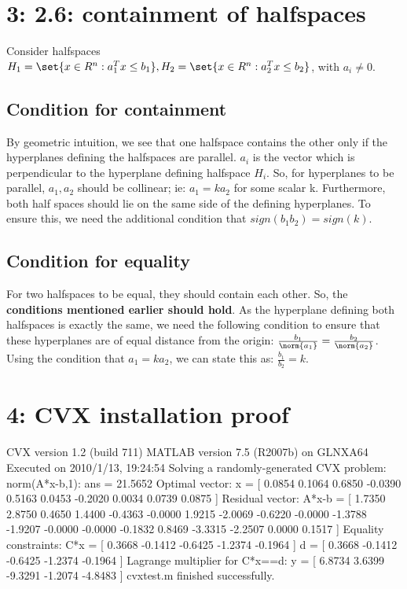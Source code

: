 \documentclass{article}
\begin{document}
\section{3: 2.6: containment of halfspaces}
Consider halfspaces $H_1 = \set{x \in R^{n}: a_1^{T}x \leq b_1}, H_2 = \set{x \in R^{n}: a_2^{T}x \leq b_2}$, with $a_i \neq 0$.

\subsection{Condition for containment}
By geometric intuition, we see that one halfspace contains the other only if the hyperplanes defining the halfspaces are parallel. $a_i$ is the vector which is perpendicular to the hyperplane defining halfspace $H_i$. So, for hyperplanes to be parallel, $a_1, a_2$ should be collinear; ie: $a_1 = k a_2$ for some scalar k. Furthermore, both half spaces should lie on the same side of the defining hyperplanes. To ensure this, we need the additional condition that $sign(b_1 b_2) = sign(k)$.

\subsection{Condition for equality}
For two halfspaces to be equal, they should contain each other. So, the \textbf{conditions mentioned earlier should hold}. As the hyperplane defining both halfspaces is exactly the same, we need the following condition to ensure that these hyperplanes are of equal distance from the origin: $\frac{b_1}{\norm{a_1}} = \frac{b_2}{\norm{a_2}}$. Using the condition that $a_1 = k a_2$, we can state this as: $\frac{b_1}{b_2} = k$.

\section{4: CVX installation proof}
\begin{verbatim*}
CVX version 1.2 (build 711)
MATLAB version 7.5 (R2007b) on GLNXA64
Executed on 2010/1/13, 19:24:54
Solving a randomly-generated CVX problem:
norm(A*x-b,1):
   ans   =   21.5652
Optimal vector:
   x     = [  0.0854  0.1064  0.6850 -0.0390  
   0.5163  0.0453 -0.2020  0.0034  0.0739  0.0875 ]
Residual vector:
   A*x-b = [  1.7350  2.8750  0.4650  1.4400 
   -0.4363 -0.0000  1.9215 -2.0069 -0.6220 -0.0000 -1.3788 
   -1.9207 -0.0000 -0.0000 -0.1832  0.8469 -3.3315 -2.2507  
   0.0000  0.1517 ]
Equality constraints:
   C*x   = [  0.3668 -0.1412 -0.6425 -1.2374 -0.1964 ]
   d     = [  0.3668 -0.1412 -0.6425 -1.2374 -0.1964 ]
Lagrange multiplier for C*x==d:
   y     = [  6.8734  3.6399 -9.3291 -1.2074 -4.8483 ]
cvxtest.m finished successfully.
\end{verbatim*}


% 
% 
\end{document}
